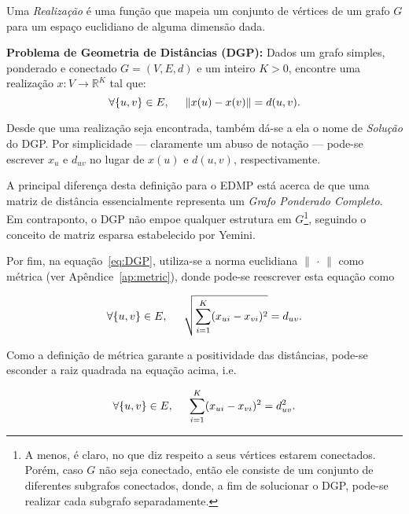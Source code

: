 Uma \textit{Realização} é uma função que mapeia um conjunto de vértices de um grafo $G$ para um espaço euclidiano de alguma dimensão dada.

\begin{center}
	\begin{minipage}{0.9 \linewidth}
		\textbf{Problema de Geometria de Distâncias (DGP):} Dados um grafo simples, ponderado e conectado $G = (V, E, d)$ e um inteiro $K>0$, encontre uma realização $x: V \longrightarrow \mathbb{R}^K$ tal que:
		\begin{equation}
		\forall \{u,v\} \in E, \hspace{0.5cm} \lVert x(u) - x(v) \rVert = d(u,v). \label{eq:DGP}
		\end{equation}
	\end{minipage}
\end{center}

Desde que uma realização seja encontrada, também dá-se a ela o nome de \textit{Solução} do DGP. Por simplicidade --- claramente um abuso de notação --- pode-se escrever $x_u$ e $d_{uv}$ no lugar de $x(u)$ e $d(u,v)$, respectivamente.

A principal diferença desta definição para o EDMP está acerca de que uma matriz de distância essencialmente representa um \textit{Grafo Ponderado Completo}. Em contraponto, o DGP não empoe qualquer estrutura em $G$\footnote{A menos, é claro, no que diz respeito a seus vértices estarem conectados. Porém, caso $G$ não seja conectado, então ele consiste de um conjunto de diferentes subgrafos conectados, donde, a fim de solucionar o DGP, pode-se realizar cada subgrafo separadamente.}, seguindo o conceito de matriz esparsa estabelecido por Yemini.

Por fim, na equação~\ref{eq:DGP}, utiliza-se a norma euclidiana $\lVert$ $\cdot$ $\rVert$ como métrica (ver Apêndice~\ref{ap:metric}), donde pode-se reescrever esta equação como

\begin{equation*}
	\forall \{u,v\} \in E, \hspace{0.5cm} \sqrt{\sum_{i=1}^{K}(x_{ui} - x_{vi})^2} = d_{uv}.
\end{equation*}

Como a definição de métrica garante a positividade das distâncias, pode-se esconder a raiz quadrada na equação acima, i.e.

\begin{equation}
\forall \{u,v\} \in E, \hspace{0.5cm} \sum_{i=1}^{K}(x_{ui} - x_{vi})^2 = d_{uv}^2.
\label{eq:DGPSistemaQuadratico}
\end{equation}

